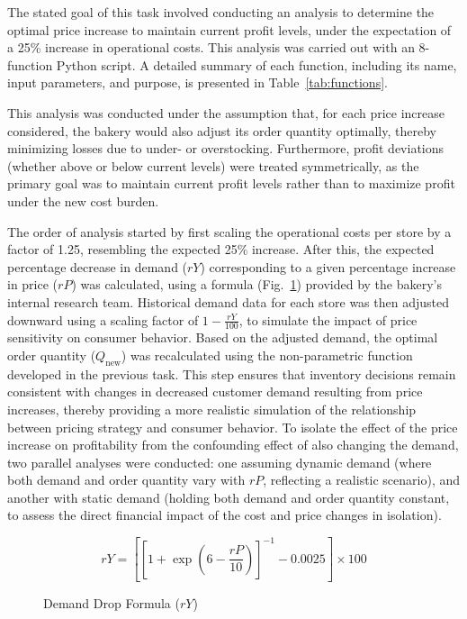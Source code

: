The stated goal of this task involved conducting an analysis to determine the optimal price increase to maintain current profit levels, under the expectation of a 25\% increase in operational costs. This analysis was carried out with an 8-function Python script. A detailed summary of each function, including its name, input parameters, and purpose, is presented in Table~\ref{tab:functions}.

This analysis was conducted under the assumption that, for each price increase considered, the bakery would also adjust its order quantity optimally, thereby minimizing losses due to under- or overstocking. Furthermore, profit deviations (whether above or below current levels) were treated symmetrically, as the primary goal was to maintain current profit levels rather than to maximize profit under the new cost burden.

The order of analysis started by first scaling the operational costs per store by a factor of 1.25, resembling the expected 25\% increase. After this, the expected percentage decrease in demand (\( rY \)) corresponding to a given percentage increase in price (\( rP \)) was calculated, using a formula (Fig.~\ref{fig:demand_drop}) provided by the bakery’s internal research team. Historical demand data for each store was then adjusted downward using a scaling factor of \( 1 - \frac{rY}{100} \), to simulate the impact of price sensitivity on consumer behavior. Based on the adjusted demand, the optimal order quantity (\( Q_{\text{new}} \)) was recalculated using the non-parametric function developed in the previous task. This step ensures that inventory decisions remain consistent with changes in decreased customer demand resulting from price increases, thereby providing a more realistic simulation of the relationship between pricing strategy and consumer behavior. To isolate the effect of the price increase on profitability from the confounding effect of also changing the demand, two parallel analyses were conducted: one assuming dynamic demand (where both demand and order quantity vary with \( rP \), reflecting a realistic scenario), and another with static demand (holding both demand and order quantity constant, to assess the direct financial impact of the cost and price changes in isolation).

\begin{figure}[h]
    \centering
    \caption{Demand Drop Formula (\( rY \))}
    \label{fig:demand_drop}
    \[
    rY = \left[ \left[ 1 + \exp\left(6 - \frac{rP}{10}\right) \right]^{-1} - 0.0025 \right] \times 100
    \]
\end{figure}

